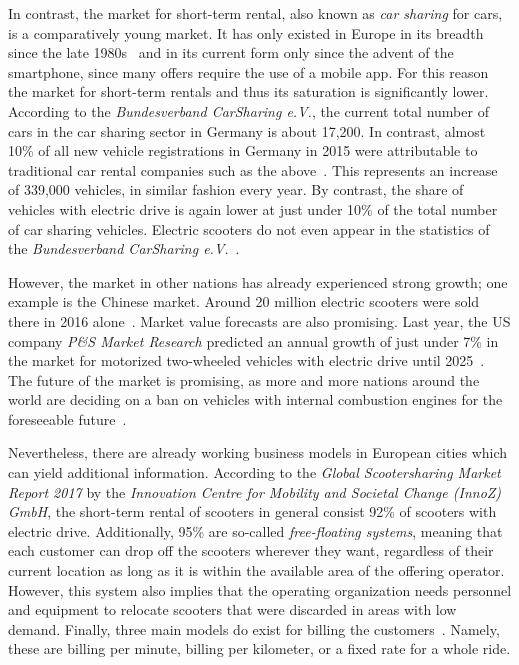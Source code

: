 \documentclass[12pt,a4paper,twoside]{report}
\begin{document}
In contrast, the market for short-term rental, also known as \textit{car sharing} for cars,
is a comparatively young market. It has only existed in Europe in its breadth
since the late 1980s~\cite{history-of-carsharing} and in its current form
only since the advent of the smartphone, since many offers require the use of a mobile app.
For this reason the market for short-term rentals and thus its saturation is significantly lower.
According to the \textit{Bundesverband CarSharing e.V.}, the current total number of cars
in the car sharing sector in Germany is about 17,200. In contrast, almost 10\% of all
new vehicle registrations in Germany in 2015 were attributable to traditional
car rental companies such as the above~\cite{sparkasse-kfz-vermietung}.
This represents an increase of 339,000 vehicles, in similar fashion every year.
By contrast, the share of vehicles with electric drive is again lower at
just under 10\% of the total number of car sharing vehicles.
Electric scooters do not even appear in the statistics of the
\textit{Bundesverband CarSharing e.V.}~\cite{bundesverband-carsharing-statistics}.

However, the market in other nations has already experienced strong growth;
one example is the Chinese market. Around 20 million electric scooters were sold
there in 2016 alone~\cite{heise-electric-scooters}. Market value forecasts are also promising.
Last year, the US company \textit{P\&S Market Research} predicted an annual growth of
just under 7\% in the market for motorized two-wheeled vehicles with
electric drive until 2025~\cite{pands-electric-scooters}.
The future of the market is promising, as more and more nations around the world
are deciding on a ban on vehicles with internal combustion engines for the
foreseeable future~\cite{faz-combustion-engine-ban}.

Nevertheless, there are already working business models in European cities
which can yield additional information.
According to the \textit{Global Scootersharing Market Report 2017} by the
\textit{Innovation Centre for Mobility and Societal Change (InnoZ) GmbH},
the short-term rental of scooters in general consist 92\% of scooters with
electric drive. Additionally, 95\% are so-called \textit{free-floating systems},
meaning that each customer can drop off the scooters wherever they want, regardless
of their current location as long as it is within the available area of the offering operator.
However, this system also implies that the operating organization needs personnel
and equipment to relocate scooters that were discarded in areas with low demand.
Finally, three main models do exist for billing the customers~\cn.
Namely, these are billing per minute, billing per kilometer, or a fixed rate for a whole ride.
\end{document}
